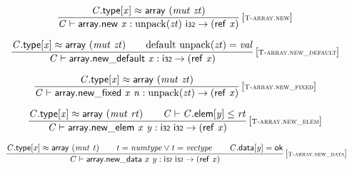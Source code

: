 \vspace{1ex}

$$
\begin{array}{@{}c@{}}\displaystyle
\frac{
{\mathit{C}}.\mathsf{type}[{\mathit{x}}] \approx \mathsf{array}~({\mathit{mut}}~{\mathit{zt}})
}{
{\mathit{C}} \vdash \mathsf{array.new}~{\mathit{x}} : {\mathrm{unpack}}({\mathit{zt}})~\mathsf{i{\scriptstyle32}} \rightarrow (\mathsf{ref}~{\mathit{x}})
} \, {[\textsc{\scriptsize T{-}array.new}]}
\qquad
\end{array}
$$

$$
\begin{array}{@{}c@{}}\displaystyle
\frac{
{\mathit{C}}.\mathsf{type}[{\mathit{x}}] \approx \mathsf{array}~({\mathit{mut}}~{\mathit{zt}})
 \qquad
{\mathrm{default}}~{\mathrm{unpack}}({\mathit{zt}}) = {\mathit{val}}
}{
{\mathit{C}} \vdash \mathsf{array.new\_default}~{\mathit{x}} : \mathsf{i{\scriptstyle32}} \rightarrow (\mathsf{ref}~{\mathit{x}})
} \, {[\textsc{\scriptsize T{-}array.new\_default}]}
\qquad
\end{array}
$$

$$
\begin{array}{@{}c@{}}\displaystyle
\frac{
{\mathit{C}}.\mathsf{type}[{\mathit{x}}] \approx \mathsf{array}~({\mathit{mut}}~{\mathit{zt}})
}{
{\mathit{C}} \vdash \mathsf{array.new\_fixed}~{\mathit{x}}~{\mathit{n}} : {\mathrm{unpack}}({\mathit{zt}}) \rightarrow (\mathsf{ref}~{\mathit{x}})
} \, {[\textsc{\scriptsize T{-}array.new\_fixed}]}
\qquad
\end{array}
$$

$$
\begin{array}{@{}c@{}}\displaystyle
\frac{
{\mathit{C}}.\mathsf{type}[{\mathit{x}}] \approx \mathsf{array}~({\mathit{mut}}~{\mathit{rt}})
 \qquad
{\mathit{C}} \vdash {\mathit{C}}.\mathsf{elem}[{\mathit{y}}] \leq {\mathit{rt}}
}{
{\mathit{C}} \vdash \mathsf{array.new\_elem}~{\mathit{x}}~{\mathit{y}} : \mathsf{i{\scriptstyle32}}~\mathsf{i{\scriptstyle32}} \rightarrow (\mathsf{ref}~{\mathit{x}})
} \, {[\textsc{\scriptsize T{-}array.new\_elem}]}
\qquad
\end{array}
$$

$$
\begin{array}{@{}c@{}}\displaystyle
\frac{
{\mathit{C}}.\mathsf{type}[{\mathit{x}}] \approx \mathsf{array}~({\mathit{mut}}~{\mathit{t}})
 \qquad
{\mathit{t}} = {\mathit{numtype}} \lor {\mathit{t}} = {\mathit{vectype}}
 \qquad
{\mathit{C}}.\mathsf{data}[{\mathit{y}}] = \mathsf{ok}
}{
{\mathit{C}} \vdash \mathsf{array.new\_data}~{\mathit{x}}~{\mathit{y}} : \mathsf{i{\scriptstyle32}}~\mathsf{i{\scriptstyle32}} \rightarrow (\mathsf{ref}~{\mathit{x}})
} \, {[\textsc{\scriptsize T{-}array.new\_data}]}
\qquad
\end{array}
$$

